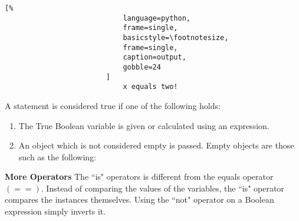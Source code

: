 \documentclass[crop=false,class=book,oneside]{standalone}
\begin{document}
                    \begin{minipage}[t]{.48\textwidth}
                        \centering
                        \begin{lstlisting}[%
                            language=python,
                            frame=single,
                            basicstyle=\footnotesize,
                            frame=single,
                            caption=output,
                            gobble=24
                        ]
                            x equals two!
                        \end{lstlisting}
                    \end{minipage}\newline
                    A statement is considered true if one of the
                    following holds:
                    \begin{enumerate}
                        \item The True Boolean variable is given or
                            calculated using an expression.
                        \item An object which is not considered empty is
                            passed. Empty objects are those such as the
                            following:
                        \begin{enumerate}
                        \end{enumerate}
                    \end{enumerate}
                \textbf{More Operators}
                    The ``is" operators is different from the equals
                    operator $(==)$. Instead of comparing the values of
                    the variables, the ``is" operator compares the
                    instances themselves. Using the ``not" operator on a
                    Boolean expression simply inverts it.\newline
\end{document}
